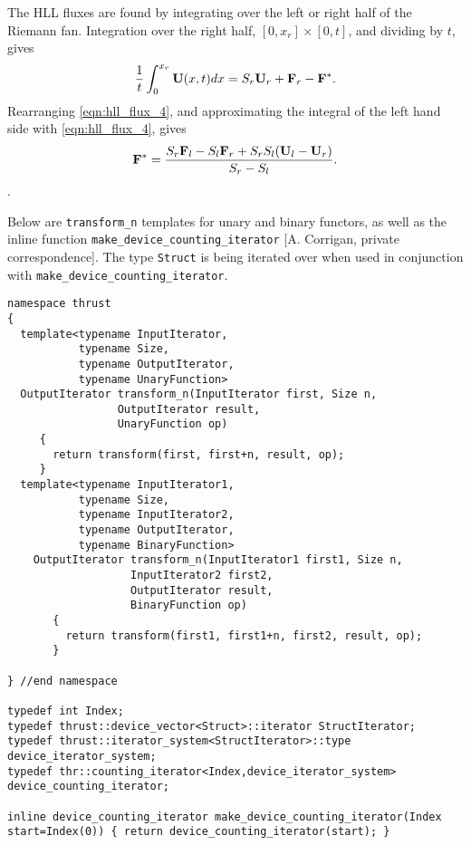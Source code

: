 The HLL fluxes are found by integrating over the left or right half of the Riemann fan.  Integration over the right half, $[0,x_r] \times [0,t]$, and dividing by $t$, gives 
\begin{gather}
\label{eqn:hll_flux_4}
\frac{1}{t}\int_{0}^{x_r} \mathbf{U}(x,t) dx = S_r\mathbf{U}_r + \mathbf{F}_r - \mathbf{F}^*.
\end{gather}
Rearranging \eqref{eqn:hll_flux_4}, and approximating the integral of the left hand side with \eqref{eqn:hll_flux_4}, gives
\begin{gather}
\label{eqn:hll_flux_5}
\mathbf{F}^* = \frac{S_r \mathbf{F}_l - S_l \mathbf{F}_r + S_r S_l (\mathbf{U}_l - \mathbf{U}_r) }{S_r - S_l}.
\end{gather}.

\clearpage

\label{app:thrust_add}

Below are \verb+transform_n+ templates for unary and binary functors, as well as the inline function \verb+make_device_counting_iterator+ [A. Corrigan, private correspondence].  The type \verb+Struct+ is being iterated over when used in conjunction with \verb+make_device_counting_iterator+.
\begin{lstlisting}
namespace thrust
{
  template<typename InputIterator,
           typename Size,
           typename OutputIterator,
           typename UnaryFunction>
  OutputIterator transform_n(InputIterator first, Size n,
			     OutputIterator result,
			     UnaryFunction op)
	 {
	   return transform(first, first+n, result, op);
	 }
  template<typename InputIterator1,
           typename Size,
           typename InputIterator2,
           typename OutputIterator,
           typename BinaryFunction>
    OutputIterator transform_n(InputIterator1 first1, Size n,
			       InputIterator2 first2,
			       OutputIterator result,
			       BinaryFunction op)
	   {
	     return transform(first1, first1+n, first2, result, op);
	   }

} //end namespace

typedef int Index;
typedef thrust::device_vector<Struct>::iterator StructIterator;
typedef thrust::iterator_system<StructIterator>::type device_iterator_system;
typedef thr::counting_iterator<Index,device_iterator_system> device_counting_iterator;

inline device_counting_iterator make_device_counting_iterator(Index start=Index(0)) { return device_counting_iterator(start); }

\end{lstlisting}
